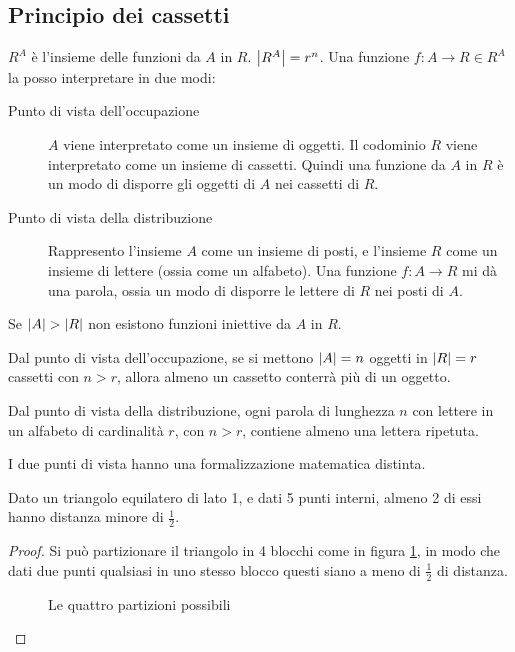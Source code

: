 \subsection{Principio dei cassetti}

$R^A$ \`e l'insieme delle funzioni da $A$ in $R$. $\left\lvert{R^A}\right\rvert = r^n$. Una funzione $f : A \to R \in R^A$ la posso interpretare in due modi:
\begin{description}
  \item[Punto di vista dell'occupazione] $A$ viene interpretato come un insieme di oggetti. Il codominio $R$ viene interpretato come un insieme di cassetti. Quindi una funzione da $A$ in $R$ \`e un modo di disporre gli oggetti di $A$ nei cassetti di $R$.
  \item[Punto di vista della distribuzione] Rappresento l'insieme $A$ come un insieme di posti, e l'insieme $R$ come un insieme di lettere (ossia come un alfabeto). Una funzione $f : A \to R$ mi d\`a una parola, ossia un modo di disporre le lettere di $R$ nei posti di $A$.
\end{description}
\begin{prop}
Se $\left\lvert{A}\right\rvert > \left\lvert{R}\right\rvert$ non esistono funzioni iniettive da $A$ in $R$.
\end{prop}
Dal punto di vista dell'occupazione, se si mettono $\left\lvert{A}\right\rvert = n$ oggetti in $\left\lvert{R}\right\rvert = r$ cassetti con $n > r$, allora almeno un cassetto conterr\`a pi\`u di un oggetto. 

Dal punto di vista della distribuzione, ogni parola di lunghezza $n$ con lettere in un alfabeto di cardinalit\`a $r$, con $n > r$, contiene almeno una lettera ripetuta.

I due punti di vista hanno una formalizzazione matematica distinta.

\begin{prop}
Dato un triangolo equilatero di lato 1, e dati 5 punti interni, almeno 2 di essi hanno distanza minore di $\frac{1}{2}$.
\end{prop}
\begin{proof}
Si pu\`o partizionare il triangolo in 4 blocchi come in figura \ref{fig:triforza}, in modo che dati due punti qualsiasi in uno stesso blocco questi siano a meno di $\frac{1}{2}$ di distanza.
\begin{figure}[ht]
\centering
{}
\caption{\label{fig:triforza}Le quattro partizioni possibili}
\end{figure}
\end{proof}

